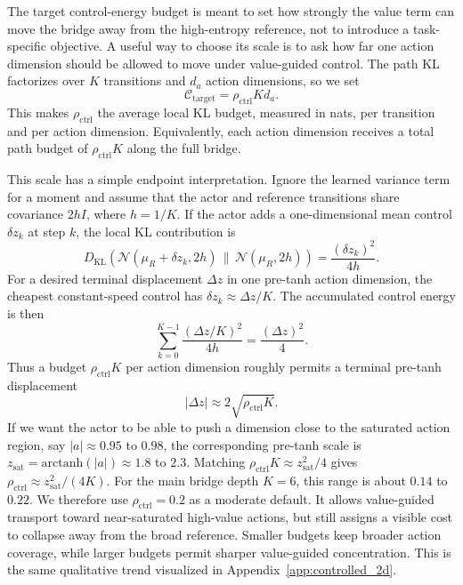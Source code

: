 \documentclass[11pt]{article}
\begin{document}
The target control-energy budget is meant to set how strongly the value term can move the bridge away from the high-entropy reference, not to introduce a task-specific objective. A useful way to choose its scale is to ask how far one action dimension should be allowed to move under value-guided control. The path KL factorizes over $K$ transitions and $d_a$ action dimensions, so we set
\begin{equation}
  \mathcal C_{\mathrm{target}}
  =
  \rho_{\mathrm{ctrl}} K d_a.
\end{equation}
This makes $\rho_{\mathrm{ctrl}}$ the average local KL budget, measured in nats, per transition and per action dimension. Equivalently, each action dimension receives a total path budget of $\rho_{\mathrm{ctrl}}K$ along the full bridge.

This scale has a simple endpoint interpretation. Ignore the learned variance term for a moment and assume that the actor and reference transitions share covariance $2hI$, where $h=1/K$. If the actor adds a one-dimensional mean control $\delta z_k$ at step $k$, the local KL contribution is
\begin{equation}
  D_{\mathrm{KL}}
  \left(
    \mathcal N(\mu_R+\delta z_k,2h)
    \,\|\,
    \mathcal N(\mu_R,2h)
  \right)
  =
  \frac{(\delta z_k)^2}{4h}.
\end{equation}
For a desired terminal displacement $\Delta z$ in one pre-tanh action dimension, the cheapest constant-speed control has $\delta z_k\approx \Delta z/K$. The accumulated control energy is then
\begin{equation}
  \sum_{k=0}^{K-1}
  \frac{(\Delta z/K)^2}{4h}
  =
  \frac{(\Delta z)^2}{4}.
\end{equation}
Thus a budget $\rho_{\mathrm{ctrl}}K$ per action dimension roughly permits a terminal pre-tanh displacement
\begin{equation}
  |\Delta z|
  \approx
  2\sqrt{\rho_{\mathrm{ctrl}}K}.
\end{equation}
If we want the actor to be able to push a dimension close to the saturated action region, say $|a|\approx 0.95$ to $0.98$, the corresponding pre-tanh scale is $z_{\mathrm{sat}}=\mathrm{arctanh}(|a|)\approx 1.8$ to $2.3$. Matching $\rho_{\mathrm{ctrl}}K\approx z_{\mathrm{sat}}^2/4$ gives $\rho_{\mathrm{ctrl}}\approx z_{\mathrm{sat}}^2/(4K)$. For the main bridge depth $K=6$, this range is about $0.14$ to $0.22$. We therefore use $\rho_{\mathrm{ctrl}}=0.2$ as a moderate default. It allows value-guided transport toward near-saturated high-value actions, but still assigns a visible cost to collapse away from the broad reference. Smaller budgets keep broader action coverage, while larger budgets permit sharper value-guided concentration. This is the same qualitative trend visualized in Appendix~\ref{app:controlled_2d}.
\end{document}
